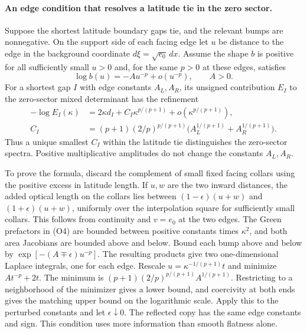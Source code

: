 \documentclass[11pt,letterpaper]{article}
\begin{document}
\paragraph{An edge condition that resolves a latitude tie in the zero sector.}
Suppose the shortest latitude boundary gaps tie, and the relevant bumps
are nonnegative. On the support side of each facing edge let \(u\) be
distance to the edge in the background coordinate \(d\xi=\sqrt{e_0}\,dx\).
Assume the shape \(b\) is positive for all sufficiently small \(u>0\)
and, for the same \(p>0\) at these edges, satisfies
\[
 \log b(u)=-A u^{-p}+o(u^{-p}),\qquad A>0.
\]
For a shortest gap \(I\) with edge constants \(A_L,A_R\), its
unsigned contribution \(E_I\) to the zero-sector mixed determinant has
the refinement
\begin{align*}
 -\log E_I(\kappa)&=2\kappa d_I+
 C_I\kappa^{p/(p+1)}+o(\kappa^{p/(p+1)}),\\
 C_I&=(p+1)(2/p)^{p/(p+1)}
      \big(A_L^{1/(p+1)}+A_R^{1/(p+1)}\big).
\end{align*}
Thus a unique smallest \(C_I\) within the latitude
tie distinguishes the zero-sector spectra. Positive multiplicative
amplitudes do not change the constants \(A_L,A_R\).

To prove the formula, discard the complement of small fixed facing
collars using the positive excess in latitude length. If \(u,w\) are the
two inward distances, the added optical length on the collars lies
between \((1-\epsilon)(u+w)\) and \((1+\epsilon)(u+w)\), uniformly over
the interpolation square for sufficiently small collars. This follows
from continuity and \(v=e_0\) at the two edges. The Green prefactors
in (O4) are bounded between positive constants times \(\kappa^2\),
and both area Jacobians are bounded above and below. Bound each bump
above and below by \(\exp[-(A\mp\epsilon)u^{-p}]\). The resulting products
give two one-dimensional Laplace integrals, one for each edge. Rescale
\(u=\kappa^{-1/(p+1)}t\) and minimize \(A t^{-p}+2t\).
The minimum is \((p+1)(2/p)^{p/(p+1)}A^{1/(p+1)}\).
Restricting to a neighborhood of the minimizer gives a lower bound,
and coercivity at both ends gives the matching upper bound on the
logarithmic scale. Apply this to the perturbed constants and let
\(\epsilon\downarrow0\). The reflected copy has the same edge constants
and sign. This condition uses more information than smooth flatness alone.
\end{document}
